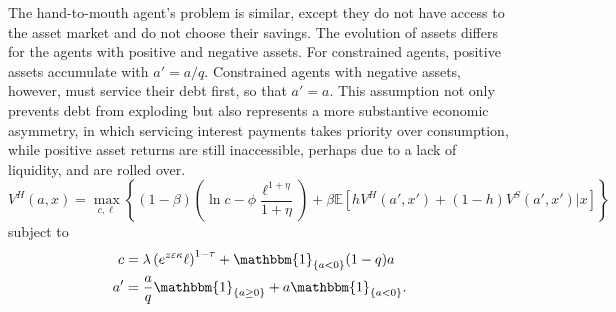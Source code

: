 The hand-to-mouth agent's problem is similar, except they do not have access to the asset market and do not choose their savings. The evolution of assets differs for the agents with positive and negative assets. For constrained agents, positive assets accumulate with $a'=a/q$. Constrained agents with negative assets, however, must service their debt first, so that $a'=a$. This assumption not only prevents debt from exploding but also represents a more substantive economic asymmetry, in which servicing interest payments takes priority over consumption, while positive asset returns are still inaccessible, perhaps due to a lack of liquidity, and are rolled over.
\[
V^H(a,x) = \max_{c,\ell} \left\{ (1-\beta) \left(\ln c- \phi \frac {\ell^{1+\eta} }{1+\eta}  \right) +\beta  \mathbb{E} \left[ h V^H(a',x') +(1-h) V^S(a',x') | x \right] \right\}
\]
subject to
\begin{align*}
	c  &=\lambda \left( e^{z\varepsilon \kappa} \ell\right) ^{1-\tau} + \mathbbm{1}_{\{a<0\}}(1-q)a \\
	a' &=\frac{a}{q}\mathbbm{1}_{\{a\geq0\}} + a\mathbbm{1}_{\{a<0\}}.
\end{align*}
